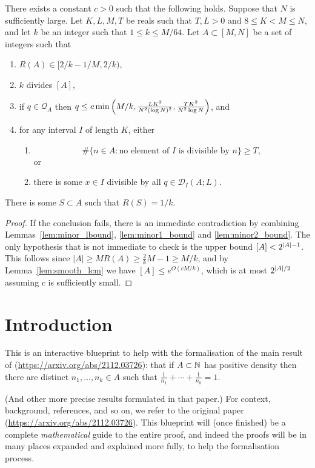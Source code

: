 \begin{proposition}\label{prop:fourier}
  \leanok
There exists a constant $c>0$ such that the following holds. Suppose that $N$ is sufficiently large. Let $K,L,M,T$ be reals such that $T,L>0$ and $8\leq K<M\leq N$, and let $k$ be an integer such that $1\leq k\leq M/64$. Let $A\subset [M,N]$ be a set of integers such that
\begin{enumerate}
\item $R(A)\in [2/k-1/M,2/k)$,
\item $k$ divides $[A]$,
\item if $q\in\mathcal{Q}_A$ then $q\leq c\min\left( M/k,\frac{LK^2}{N^2(\log N)^2},\frac{TK^2}{N^2\log N}\right)$,  and
\item for any interval $I$ of length $K$, either
\begin{enumerate}
\item \[\# \{ n\in A : \textrm{no element of }I\textrm{ is divisible by }n\}\geq T,\]
or
\item there is some $x\in I$ divisible by all $q\in\mathcal{D}_I(A; L)$.
\end{enumerate}
\end{enumerate}
There is some $S\subset A$ such that $R(S)=1/k$.
\end{proposition}
\begin{proof}
  \leanok
{}
If the conclusion fails, there is an immediate contradiction by combining Lemmas~\ref{lem:minor_lbound}, \ref{lem:minor1_bound} and \ref{lem:minor2_bound}. The only hypothesis that is not immediate to check is the upper bound $[A]<2^{\left\lvert A\right\rvert-1}$. This follows since $\lvert A\rvert \geq MR(A)\geq \frac{2}{k}M-1\geq M/k$, and by Lemma~\ref{lem:smooth_lcm} we have $[A]\leq e^{O(cM/k)}$, which is at most $2^{\left\lvert A\right\rvert/2}$ assuming $c$ is sufficiently small.
\end{proof}


\chapter*{Introduction}
\label{cha:intro}

This is an interactive blueprint to help with the formalisation of the main result of (\url{https://arxiv.org/abs/2112.03726}): that if $A\subset \mathbb{N}$ has positive density then there are distinct $n_1,\ldots,n_k\in A$ such that $\frac{1}{n_1}+\cdots+\frac{1}{n_k}=1$. 

(And other more precise results formulated in that paper.) For context, background, references, and so on, we refer to the original paper (\url{https://arxiv.org/abs/2112.03726}). This blueprint will (once finished) be a complete \emph{mathematical} guide to the entire proof, and indeed the proofs will be in many places expanded and explained more fully, to help the formalisation process.

